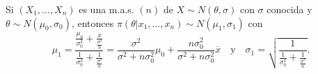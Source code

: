 \begin{eg}
Si $\displaystyle \left(X_{1}, \ldots, X_{n}\right) $ es una m.a.s. $\displaystyle \left(n\right) $ de $\displaystyle X\sim N\left(\theta, \sigma \right) $ con $\displaystyle \sigma  $ conocida y $\displaystyle \theta\sim N\left(\mu_{0}, \sigma_{0}\right) $, entonces $\displaystyle \pi\left(\theta|x_{1}, \ldots, x_{n}\right)\sim N\left(\mu_{1}, \sigma_{1}\right) $ con 
\[\mu_{1}=\frac{\frac{\mu_{0}}{\sigma_{0}^{2}}+\frac{\overline{x}}{\frac{\sigma^{2}}{n}}}{\frac{1}{\sigma_{0}^{2}}+\frac{1}{\frac{\sigma^{2}}{n}}} = \frac{\sigma^{2}}{\sigma^{2} + n\sigma ^{2}_{0}}\mu_{0} + \frac{n\sigma_{0}^{2}}{\sigma^{2}+n\sigma^{2}_{0}}\overline{x} \quad \text{y} \quad \sigma_{1}=\sqrt{\frac{1}{\frac{1}{\sigma^{2}_{0}}+\frac{1}{\frac{\sigma^{2}}{n}}}}.\]
\end{eg}

